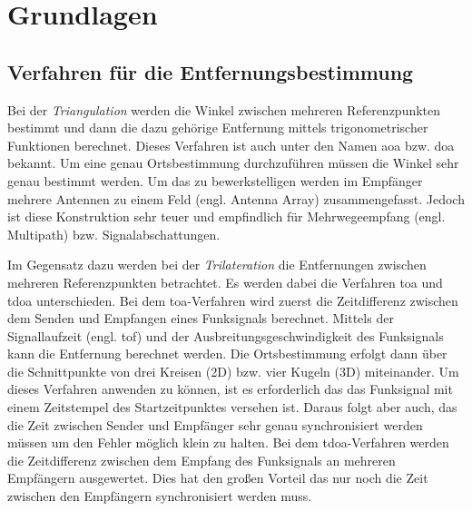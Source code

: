 %
%
%	
%
\chapter{Grundlagen}


%
%
\section{Verfahren für die Entfernungsbestimmung}

Bei der \textit{Triangulation} werden die Winkel zwischen mehreren Referenzpunkten bestimmt und dann die dazu gehörige Entfernung mittels trigonometrischer Funktionen berechnet. Dieses Verfahren ist auch unter den Namen \Gls{aoa} bzw. \Gls{doa} bekannt. Um eine genau Ortsbestimmung durchzuführen müssen die Winkel sehr genau bestimmt werden. Um das zu bewerkstelligen werden im Empfänger mehrere Antennen zu einem Feld (engl. Antenna Array) zusammengefasst. Jedoch ist diese Konstruktion sehr teuer und empfindlich für Mehrwegeempfang (engl. Multipath) bzw. Signalabschattungen. \cite{gezici2005localization, liu2007survey, decawave2014rtls}

Im Gegensatz dazu werden bei der \textit{Trilateration} die Entfernungen zwischen mehreren Referenzpunkten betrachtet. Es werden dabei die Verfahren \Gls{toa} und \Gls{tdoa} unterschieden.
Bei dem \Gls{toa}-Verfahren wird zuerst die Zeitdifferenz zwischen dem Senden und Empfangen eines Funksignals berechnet. Mittels der Signallaufzeit (engl. \acrfull{tof}) und der Ausbreitungsgeschwindigkeit des Funksignals kann die Entfernung berechnet werden. Die Ortsbestimmung erfolgt dann über die Schnittpunkte von drei Kreisen (2D) bzw. vier Kugeln (3D) miteinander. Um dieses Verfahren anwenden zu können, ist es erforderlich das das Funksignal mit einem Zeitstempel des Startzeitpunktes versehen ist. Daraus folgt aber auch, das die Zeit zwischen Sender und Empfänger sehr genau synchronisiert werden müssen um den Fehler möglich klein zu halten.
Bei dem \Gls{tdoa}-Verfahren werden die Zeitdifferenz zwischen dem Empfang des Funksignals an mehreren Empfängern ausgewertet. Dies hat den großen Vorteil das nur noch die Zeit zwischen den Empfängern synchronisiert werden muss. \cite{zekavat2011handbook, decawave2014rtls}

